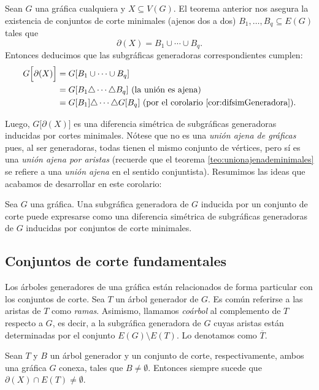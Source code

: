 Sean $G$ una gráfica cualquiera y $X \subseteq V(G)$. El teorema anterior nos asegura la existencia de conjuntos de corte minimales (ajenos dos a dos) $B_{1},\ldots,B_{q} \subseteq E(G)$ tales que
$$\partial(X) = B_{1} \cup \cdots \cup B_{q}. $$
Entonces deducimos que las subgráficas generadoras correspondientes cumplen:
\begin{align*}
    G\Big[\partial(X)\Big] &= G [B_{1} \cup \cdots \cup B_{q}] \\
                           &= G [B_{1} \triangle \cdots \triangle B_{q}] \textnormal{ (la unión es ajena)}\\
                           &= G [B_{1}] \triangle \cdots \triangle G[B_{q}] \textnormal{ (por el corolario \ref{cor:difsimGeneradora})}.
\end{align*}

Luego, $G\Big[\partial(X)\Big]$ es una diferencia simétrica de subgráficas generadoras inducidas por cortes minimales. Nótese que no es una \textit{unión ajena de gráficas} pues, al ser generadoras, todas tienen el mismo conjunto de vértices, pero sí es una \textit{unión ajena por aristas} (recuerde que el teorema \ref{teo:unionajenademinimales} se refiere a una \textit{unión ajena} en el sentido conjuntista). Resumimos las ideas que acabamos de desarrollar en este corolario:

\begin{cor}\label{cor:unionajenademinimalesgeneradores}
Sea $G$ una gráfica. Una subgráfica generadora de $G$ inducida por un conjunto de corte puede expresarse como una diferencia simétrica de subgráficas generadoras de $G$ inducidas por conjuntos de corte minimales.
\end{cor}



\subsection{Conjuntos de corte fundamentales}
Los árboles generadores de una gráfica están relacionados de forma particular con los conjuntos de corte. Sea $T$ un árbol generador de $G$. Es común referirse a las aristas de $T$ como \textit{ramas}. Asimismo, llamamos \textit{coárbol}  al complemento de $T$ respecto a $G$, es decir, a la subgráfica generadora de $G$ cuyas aristas están determinadas por el conjunto $E(G)\setminus E(T)$. Lo denotamos como $\overline{T}$. 

\begin{prop}\label{prop:bondintersection}
Sean $T$ y $B$ un árbol generador y un conjunto de corte, respectivamente, ambos una gráfica $G$ conexa, tales que $B \neq  \emptyset$. Entonces siempre sucede que $\partial(X) \cap E(T) \neq \emptyset$.

\end{prop}

